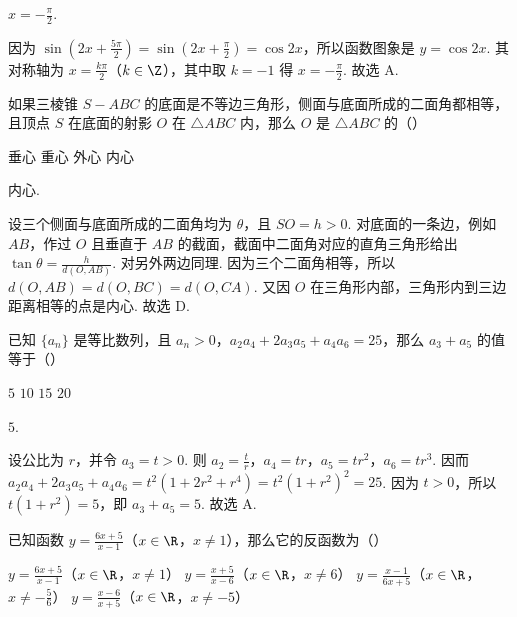 \documentclass[UTF8,a4paper,oneside,11pt]{ctexbook}
\begin{document}
\begin{answer}
\(x=-\frac{\pi}{2}\).
\end{answer}

\begin{solution}
因为 \(\sin\left(2x+\frac{5\pi}{2}\right)=\sin\left(2x+\frac{\pi}{2}\right)=\cos2x\)，所以函数图象是 \(y=\cos2x\). 其对称轴为 \(x=\frac{k\pi}{2}\)（\(k\in\Z\)），其中取 \(k=-1\) 得 \(x=-\frac{\pi}{2}\). 故选 A.
\end{solution}

\begin{problem}
如果三棱锥 \(S-ABC\) 的底面是不等边三角形，侧面与底面所成的二面角都相等，且顶点 \(S\) 在底面的射影 \(O\) 在 \(\triangle ABC\) 内，那么 \(O\) 是 \(\triangle ABC\) 的（\quad）

\choices
    {垂心}
    {重心}
    {外心}
    {内心}
\end{problem}

\begin{answer}
内心.
\end{answer}

\begin{solution}
设三个侧面与底面所成的二面角均为 \(\theta\)，且 \(SO=h>0\). 对底面的一条边，例如 \(AB\)，作过 \(O\) 且垂直于 \(AB\) 的截面，截面中二面角对应的直角三角形给出 \(\tan\theta=\frac{h}{d(O,AB)}\). 对另外两边同理. 因为三个二面角相等，所以 \(d(O,AB)=d(O,BC)=d(O,CA)\). 又因 \(O\) 在三角形内部，三角形内到三边距离相等的点是内心. 故选 D.
\end{solution}

\begin{problem}
已知 \(\{a_{n}\}\) 是等比数列，且 \(a_{n}>0\)，\(a_{2}a_{4}+2a_{3}a_{5}+a_{4}a_{6}=25\)，那么 \(a_{3}+a_{5}\) 的值等于（\quad）

\choices
    {\(5\)}
    {\(10\)}
    {\(15\)}
    {\(20\)}
\end{problem}

\begin{answer}
\(5\).
\end{answer}

\begin{solution}
设公比为 \(r\)，并令 \(a_3=t>0\). 则 \(a_2=\frac{t}{r}\)，\(a_4=tr\)，\(a_5=tr^2\)，\(a_6=tr^3\). 因而
\(a_2a_4+2a_3a_5+a_4a_6=t^2(1+2r^2+r^4)=t^2(1+r^2)^2=25\).
因为 \(t>0\)，所以 \(t(1+r^2)=5\)，即 \(a_3+a_5=5\). 故选 A.
\end{solution}

\begin{problem}
已知函数 \(y = \frac{6x + 5}{x - 1}\)（\(x \in \R\)，\(x \neq 1\)），那么它的反函数为（\quad）

\choices
    {\(y = \frac{6x + 5}{x - 1}\)（\(x \in \R\)，\(x \neq 1\)）}
    {\(y = \frac{x + 5}{x - 6}\)（\(x \in \R\)，\(x \neq 6\)）}
    {\(y = \frac{x - 1}{6x + 5}\)（\(x \in \R\)，\(x \neq -\frac{5}{6}\)）}
    {\(y = \frac{x - 6}{x + 5}\)（\(x \in \R\)，\(x \neq -5\)）}
\end{problem}
\end{document}
